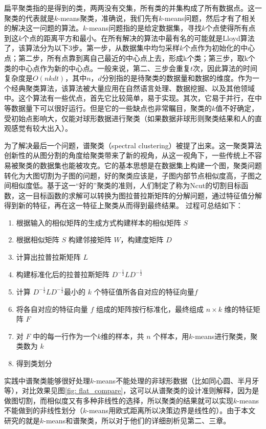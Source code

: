 扁平聚类指的是得到的类，两两没有交集，所有类的并集构成了所有数据点。这一聚类的代表就是$k$-means聚类，准确说，我们先有$k$-means问题，然后才有了相关的解决这一问题的算法。$k$-means问题指的是给定数据集，寻找$k$个点使得所有点到这$k$个点的距离平方和最小。在所有解决的算法中最有名的可能就是Lloyd算法了，该算法分为以下3步。第一步，从数据集中均匀采样$k$个点作为初始化的中心点；第二步，所有点靠到离自己最近的中心点上去，形成k个类；第三步，取k个类的中心点作为新的中心点。一般来说，第二、三步会重复$t$次，因此算法的时间复杂度是$O(nkdt)$，其中$n$，$d$分别指的是待聚类的数据量和数据的维度。作为一个经典聚类算法，该算法被大量应用在自然语言处理、数据挖掘、以及其他领域中。这个算法有一些优点，首先它比较简单，易于实现。其次，它易于并行，在中等数据量下可以很好运行。但是它的一些缺点也非常瞩目，聚类的$k$值不好确定，受初始点影响大，仅能对球形数据进行聚类（如果数据非球形则聚类结果和人的直观感觉有较大出入）。

为了解决最后一个问题，谱聚类（spectral clustering）被提了出来。这一聚类算法创新性的从图分割的角度给聚类带来了新的视角，从这一视角下，一些传统上不容易被聚类的数据集也能被攻克。它的基本思想是在数据集上构建一个图，聚类问题转化为大图切割为子图的问题，好的聚类应该是，子图内部节点相似度高，子图之间相似度低。基于这一“好的”聚类的准则，人们制定了称为Ncut的切割目标函数，这一目标函数的求解可以转换为图拉普拉斯矩阵的分解问题，通过特征值分解得到新的特征，再在这一特征上聚类从而得到最终结果。
过程可总结如下：
\begin{enumerate}
    \item 根据输入的相似矩阵的生成方式构建样本的相似矩阵 $S$
    \item 根据相似矩阵 $S$ 构建邻接矩阵 $W$，构建度矩阵 $D$
    \item 计算出拉普拉斯矩阵 $L$
    \item 构建标准化后的拉普拉斯矩阵 $D^{- \frac{1}{2}}L D^{- \frac{1}{2}}$
    \item 计算 $D^{- \frac{1}{2}}L D^{- \frac{1}{2}}$最小的 $k$ 个特征值所各自对应的特征向量$f$
    \item 将各自对应的特征向量 $f$ 组成的矩阵按行标准化，最终组成 $n\times k$ 维的特征矩阵 $F$
    \item 对 $F$ 中的每一行作为一个$k$维的样本，共 $n$ 个样本，用$k$-means进行聚类，聚类数为 $k$
    \item 得到类划分
\end{enumerate}
实践中谱聚类能够很好处理$k$-means不能处理的非球形数据（比如同心圆、半月牙等），对比效果见图\ref{fig: flat_compare}，这可以从谱聚类的设计准则解释，因为是做图切割，而相似度又有多种非线性的选择，所以聚类的结果就可以实现$k$-means不能做到的非线性划分（$k$-means用欧式距离所以决策边界是线性的）。由于本文研究的就是$k$-means和谱聚类，所以对于他们的详细剖析见第二、三章。

